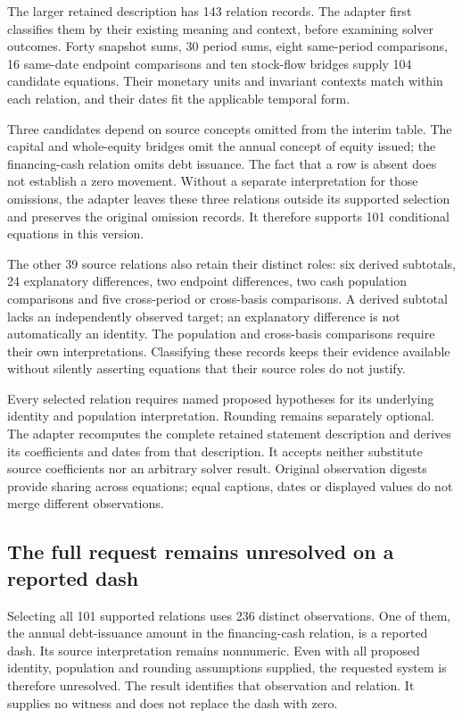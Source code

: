 The larger retained description has 143 relation records. The adapter first
classifies them by their existing meaning and context, before examining solver
outcomes. Forty snapshot sums, 30 period sums, eight same-period comparisons,
16 same-date endpoint comparisons and ten stock-flow bridges supply 104
candidate equations. Their monetary units and invariant contexts match within
each relation, and their dates fit the applicable temporal form.

Three candidates depend on source concepts omitted from the interim table.
The capital and whole-equity bridges omit the annual concept of equity issued;
the financing-cash relation omits debt issuance. The fact that a row is absent
does not establish a zero movement. Without a separate interpretation for those
omissions, the adapter leaves these three relations outside its supported
selection and preserves the original omission records. It therefore supports
101 conditional equations in this version.

The other 39 source relations also retain their distinct roles: six derived
subtotals, 24 explanatory differences, two endpoint differences, two cash
population comparisons and five cross-period or cross-basis comparisons.
A derived subtotal lacks an independently observed target; an explanatory
difference is not automatically an identity. The population and cross-basis
comparisons require their own interpretations. Classifying these records keeps
their evidence available without silently asserting equations that their
source roles do not justify.

Every selected relation requires named proposed hypotheses for its underlying
identity and population interpretation. Rounding remains separately optional.
The adapter recomputes the complete retained statement description and derives
its coefficients and dates from that description. It accepts neither substitute
source coefficients nor an arbitrary solver result. Original observation digests
provide sharing across equations; equal captions, dates or displayed values do
not merge different observations.

\subsection{The full request remains unresolved on a reported dash}

Selecting all 101 supported relations uses 236 distinct observations. One of
them, the annual debt-issuance amount in the financing-cash relation, is a
reported dash. Its source interpretation remains nonnumeric. Even with all
proposed identity, population and rounding assumptions supplied, the requested
system is therefore unresolved. The result identifies that observation and
relation. It supplies no witness and does not replace the dash with zero.


